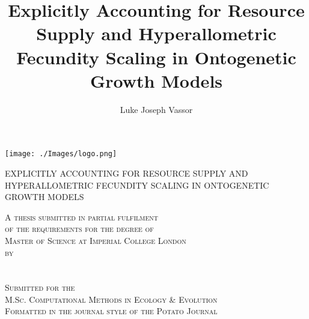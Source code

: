 \documentclass[a4paper]{article} %
\title{Explicitly Accounting for Resource Supply and Hyperallometric Fecundity Scaling in Ontogenetic Growth Models}
\author{Luke Joseph Vassor}
\begin{document}
\begin{titlepage}
    
    \texttt{[image: ./Images/logo.png]}\\%
     
    
    \center %
    
    
    \makeatletter
    \linespread{1.5} %
        {\huge{EXPLICITLY ACCOUNTING FOR RESOURCE SUPPLY AND HYPERALLOMETRIC FECUNDITY SCALING IN ONTOGENETIC GROWTH MODELS}\par} %
    \vspace{2.5cm} %

    \textsc{A thesis submitted in partial fulfilment \\ of the requirements for the degree of \\ Master of Science at Imperial College London \\ by \\ \ }\\[2.5cm]
    \textsc{\Large \@author}\\[2.5cm]
    \textsc{Submitted for the \\ M.Sc. Computational Methods in Ecology \& Evolution \\ Formatted in the journal style of the Potato Journal \\ \ }\\[2cm]


\end{titlepage}
\end{document}
